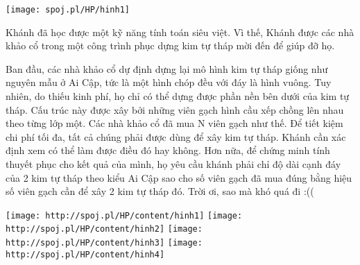 \texttt{[image: spoj.pl/HP/hinh1]}

Khánh đã học được một kỹ năng tính toán siêu việt. Vì thế, Khánh được các nhà khảo cổ trong một công trình phục dựng kim tự tháp mời đến để giúp đỡ họ.

Ban đầu, các nhà khảo cổ dự định dựng lại mô hình kim tự tháp giống như nguyên mẫu ở Ai Cập, tức là một hình chóp đều với đáy là hình vuông. Tuy nhiên, do thiếu kinh phí, họ chỉ có thể dựng được phần nền bên dưới của kim tự tháp. Cấu trúc này được xây bởi những viên gạch hình cầu xếp chồng lên nhau theo từng lớp một. Các nhà khảo cổ đã mua N viên gạch như thế. Để tiết kiệm chi phí tối đa, tất cả chúng phải được dùng để xây kim tự tháp. Khánh cần xác định xem có thể làm được điều đó hay không. Hơn nữa, để chứng minh tính thuyết phục cho kết quả của mình, họ yêu cầu khánh phải chỉ độ dài cạnh đáy của 2 kim tự tháp theo kiểu Ai Cập sao cho số viên gạch đã mua đúng bằng hiệu số viên gạch cần để xây 2 kim tự tháp đó. Trời ơi, sao mà khó quá đi :((


\texttt{[image: http://spoj.pl/HP/content/hinh1]}
\texttt{[image: http://spoj.pl/HP/content/hinh2]}
\texttt{[image: http://spoj.pl/HP/content/hinh3]}
\texttt{[image: http://spoj.pl/HP/content/hinh4]}